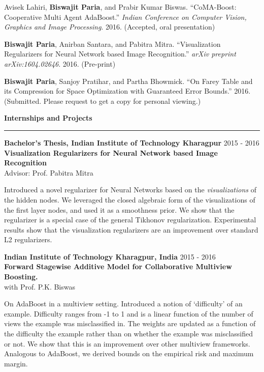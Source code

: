 \documentclass[10pt]{article}
\newcommand{\heading}[1]{
 {\large \textbf{#1}}
  \vspace{0.4em}
  \hrule
  \vspace{0.4em}
}
\newcommand{\EntryGap}{\vspace{0.4	cm}}
\newcommand{\SmallEntryGap}{\vspace{0.2cm}}
\newcommand{\indentedpar}[1]{
  \hangindent=1cm \hangafter=0 #1
}
\begin{document}
  \SmallEntryGap
  Avisek Lahiri, \textbf{Biswajit Paria}, and Prabir Kumar Biswas.
  ``CoMA-Boost: Cooperative Multi Agent AdaBoost.''
  \emph{Indian Conference on Computer Vision, Graphics and Image Processing}. 2016.
  (Accepted, oral presentation)
  
  \SmallEntryGap
  \textbf{Biswajit Paria}, Anirban Santara, and Pabitra Mitra.
  ``Visualization Regularizers for Neural Network based Image Recognition.''
  \emph{arXiv preprint arXiv:1604.02646}. 2016. (Pre-print)
  
  \SmallEntryGap
  \textbf{Biswajit Paria}, Sanjoy Pratihar, and Partha Bhowmick.
  ``On Farey Table and its Compression for Space Optimization with Guaranteed Error Bounds.''
  2016. (Submitted. Please request to get a copy for personal viewing.)


\EntryGap

\heading{Internships and Projects}

\textbf{Bachelor's Thesis, Indian Institute of Technology Kharagpur} \hfill 2015 - 2016\\
\textbf{Visualization Regularizers for Neural Network based Image Recognition}\\
Advisor: Prof. Pabitra Mitra

\SmallEntryGap

\indentedpar{
    Introduced a novel regularizer for Neural Networks
    based on the \emph{visualizations} of the hidden nodes. 
    We leveraged the closed algebraic form of the
    visualizations of the first layer nodes, and used it as a smoothness prior.
    We show that the regularizer is a special case of the 
    general Tikhonov regularization. Experimental results show that the 
    visualization regularizers are an improvement over standard L2 regularizers.
}

\SmallEntryGap

\textbf{Indian Institute of Technology Kharagpur, India} \hfill 2015 - 2016\\
\textbf{Forward Stagewise Additive Model for Collaborative Multiview Boosting.}\\
with Prof. P.K. Biswas

\SmallEntryGap

\indentedpar{
  On AdaBoost in a multiview setting.
  Introduced a notion of ‘difficulty’ of an example. Difficulty ranges 
  from -1 to 1 and is a linear function of the number of views the example
  was misclassified in. The weights are updated as a function of the 
  difficulty the example rather than on whether the example was misclassified
  or not. We show that this is an improvement over other multiview frameworks. Analogous
  to AdaBoost, we derived bounds on 
  the empirical risk and maximum margin.
}
\end{document}
